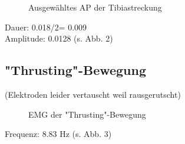 \begin{figure}[H]
\caption{Ausgewähltes AP der Tibiastreckung}
\label{kick-ap}
\end{figure}

Dauer: 0.018/2= 0.009\\
Amplitude: 0.0128 (s. Abb. 2)

\subsection{"{}Thrusting"{}-Bewegung}
(Elektroden leider vertauscht weil rausgerutscht)
\begin{figure}[H]
\caption{EMG der "{}Thrusting"{}-Bewegung}
\label{thrust}
\end{figure}
Frequenz: 8.83 Hz (s. Abb. 3)

